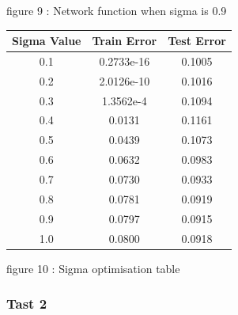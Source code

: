 \documentclass{IEEEtran}[11pt]
\begin{document}
\begin{flushleft}
\vspace{1.5mm}
{\footnotesize figure 9 : Network function when sigma is 0.9 }
\\
\vspace{1.5mm}
\end{flushleft}
\begin{center}
\begin{tabular}{||c c c||}
  \hline
Sigma Value & Train Error & Test Error \\ [0.5ex]
\hline
0.1 & 0.2733e-16 & 0.1005\\
0.2 & 2.0126e-10 & 0.1016\\
0.3 & 1.3562e-4 & 0.1094\\
0.4 & 0.0131 & 0.1161 \\
0.5 & 0.0439 & 0.1073 \\
0.6 & 0.0632 & 0.0983\\
0.7 & 0.0730 & 0.0933\\
0.8 & 0.0781 & 0.0919\\
0.9 & 0.0797 & 0.0915\\
1.0 & 0.0800 & 0.0918\\
\hline
\end{tabular}
\end{center}
\vspace{1.5mm}
{\footnotesize figure 10 : Sigma optimisation table }
\\
\vspace{1.5mm}
\subsubsection{Tast 2}
\end{document}
